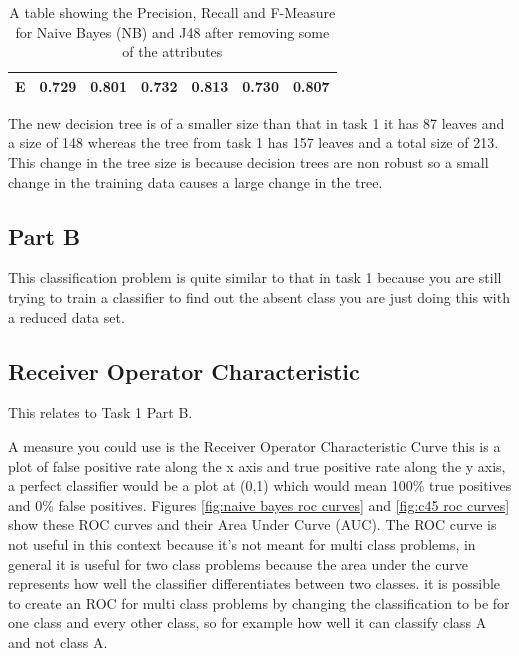 \documentclass[10pt]{article}
\begin{document}
\begin{table}[]
\begin{tabular}{@{}|l|l|l|l|l|l|l|@{}}
E                                                        & 0.729                                                   & 0.801                                                    & 0.732                                                & 0.813                                                 & 0.730                                                   & 0.807                                                    \\ \bottomrule
\end{tabular}
\caption{ A  table showing the Precision, Recall and F-Measure for Naive Bayes (NB) and J48 after removing some of the attributes}
\label{tab:valuetabletask3}
\end{table}

The new decision tree is of a smaller size than that in task 1 it has 87 leaves and a size of 148 whereas the tree from task 1 has 157 leaves and a total size of 213. This change in the tree size is because decision trees are non robust so a small change in the training data causes a large change in the tree\cite[p.316]{JamesGareth2013Aits}.

\subsection*{Part B}

This classification problem is quite similar to that in task 1 because you are still trying to train a classifier to find out the absent class you are just doing this with a reduced data set.


\nocite{*}


\begin{appendices}
\section{Receiver Operator Characteristic}
\label{appendix:roc}
This relates to Task 1 Part B.

A measure you could use is the Receiver Operator Characteristic Curve this is a plot of false positive rate along the x axis and true positive rate along the y axis, a perfect classifier would be a plot at (0,1) which would mean 100\% true positives and 0\% false positives. Figures \ref{fig:naive bayes roc curves} and \ref{fig:c45 roc curves} show these ROC curves and their Area Under Curve (AUC). The ROC curve is not useful in this context because it's not meant for multi class problems, in general it is useful for two class problems\cite{Hand2009} because the area under the curve represents how well the classifier differentiates between two classes. it is possible to create an ROC for multi class problems by changing the classification to be for one class and every other class, so for example how well it can classify class A and not class A. 


\end{appendices}
\end{document}
